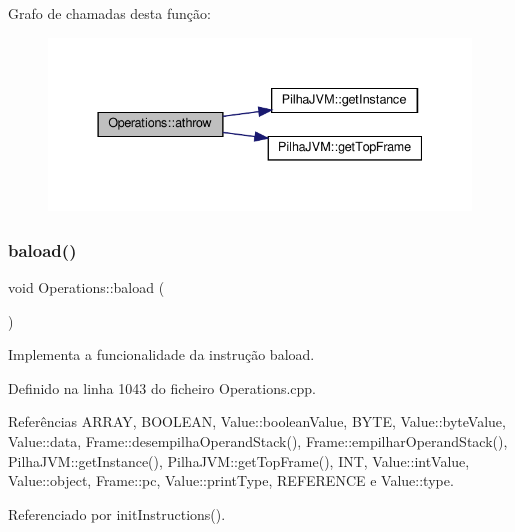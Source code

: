 Grafo de chamadas desta função\+:
\nopagebreak
\begin{figure}[H]
\begin{center}
\leavevmode
\includegraphics[width=337pt]{classOperations_a2a5eea0fb18391bb3854dfe55c8ac5d3_cgraph}
\end{center}
\end{figure}
\mbox{\label{classOperations_afdf1759637e332569a2b2b17067e05f0}} 
\subsubsection{\texorpdfstring{baload()}{baload()}}
{\footnotesize\ttfamily void Operations\+::baload (\begin{DoxyParamCaption}{ }\end{DoxyParamCaption})\hspace{0.3cm}{\ttfamily [private]}}



Implementa a funcionalidade da instrução baload. 



Definido na linha 1043 do ficheiro Operations.\+cpp.



Referências A\+R\+R\+AY, B\+O\+O\+L\+E\+AN, Value\+::boolean\+Value, B\+Y\+TE, Value\+::byte\+Value, Value\+::data, Frame\+::desempilha\+Operand\+Stack(), Frame\+::empilhar\+Operand\+Stack(), Pilha\+J\+V\+M\+::get\+Instance(), Pilha\+J\+V\+M\+::get\+Top\+Frame(), I\+NT, Value\+::int\+Value, Value\+::object, Frame\+::pc, Value\+::print\+Type, R\+E\+F\+E\+R\+E\+N\+CE e Value\+::type.



Referenciado por init\+Instructions().


